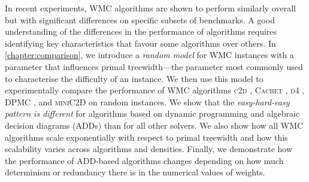 
In recent experiments, \textsf{WMC} algorithms are shown to perform similarly overall but with significant differences on specific subsets of benchmarks. A good understanding of the differences in the performance of algorithms requires identifying key characteristics that favour some algorithms over others. In \cref{chapter:comparison}, we introduce a \emph{random model} for \textsf{WMC} instances with a parameter that influences primal treewidth---the parameter most commonly used to characterise the difficulty of an instance. We then use this model to experimentally compare the performance of \textsf{WMC} algorithms \textsc{c2d} \citep{DBLP:conf/ecai/Darwiche04}, \textsc{Cachet} \citep{DBLP:conf/sat/SangBBKP04}, \textsc{d4} \citep{DBLP:conf/ijcai/LagniezM17}, \textsc{DPMC} \citep{DBLP:conf/cp/DudekPV20}, and \textsc{miniC2D} \citep{DBLP:conf/ijcai/OztokD15} on random instances. We show that the \emph{easy-hard-easy pattern is different} for algorithms based on dynamic programming and algebraic decision diagrams (ADDs) than for all other solvers. We also show how all \textsf{WMC} algorithms scale exponentially with respect to primal treewidth and how this scalability varies across algorithms and densities. Finally, we demonstrate how the performance of ADD-based algorithms changes depending on how much determinism or redundancy there is in the numerical values of weights.


